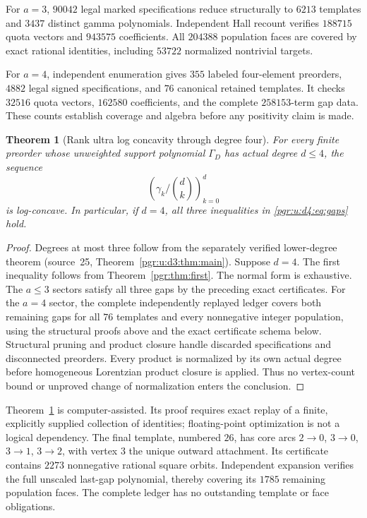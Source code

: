 \documentclass[11pt]{article}
\numberwithin{equation}{section}
\newtheorem{theorem}{Theorem}[section]\newtheorem{lemma}[theorem]{Lemma}\newtheorem{proposition}[theorem]{Proposition}\newtheorem{corollary}[theorem]{Corollary}
\theoremstyle{definition}\newtheorem{definition}[theorem]{Definition}\newtheorem{remark}[theorem]{Remark}
\newcommand{\Ga}{\Gamma}                   %
\begin{document}
For $a=3$, $90042$ legal marked specifications reduce structurally to $6213$ templates and $3437$ distinct gamma polynomials. Independent Hall recount verifies $188715$ quota vectors and $943575$ coefficients. All $204388$ population faces are covered by exact rational identities, including $53722$ normalized nontrivial targets.

For $a=4$, independent enumeration gives $355$ labeled four-element preorders, $4882$ legal signed specifications, and $76$ canonical retained templates. It checks $32516$ quota vectors, $162580$ coefficients, and the complete $258153$-term gap data. These counts establish coverage and algebra before any positivity claim is made.

\begin{theorem}[Rank ultra log concavity through degree four]\label{pgr:u:d4:thm:middle}
For every finite preorder whose unweighted support polynomial $\Ga_D$ has actual degree $d\le4$, the sequence
\[
 \left(\gamma_k/\binom dk\right)_{k=0}^d
\]
is log-concave. In particular, if $d=4$, all three inequalities in \eqref{pgr:u:d4:eq:gaps} hold.
\end{theorem}
\begin{proof}
Degrees at most three follow from the separately verified lower-degree theorem (source~25, Theorem~\ref{pgr:u:d3:thm:main}). Suppose $d=4$. The first inequality follows from Theorem~\ref{pgr:thm:first}. The normal form is exhaustive. The $a\le3$ sectors satisfy all three gaps by the preceding exact certificates. For the $a=4$ sector, the complete independently replayed ledger covers both remaining gaps for all $76$ templates and every nonnegative integer population, using the structural proofs above and the exact certificate schema below. Structural pruning and product closure handle discarded specifications and disconnected preorders. Every product is normalized by its own actual degree before homogeneous Lorentzian product closure is applied. Thus no vertex-count bound or unproved change of normalization enters the conclusion.
\end{proof}
Theorem~\ref{pgr:u:d4:thm:middle} is computer-assisted. Its proof requires exact replay of a finite, explicitly supplied collection of identities; floating-point optimization is not a logical dependency. The final template, numbered $26$, has core arcs $2\to0$, $3\to0$, $3\to1$, $3\to2$, with vertex $3$ the unique outward attachment. Its certificate contains $2273$ nonnegative rational square orbits. Independent expansion verifies the full unscaled last-gap polynomial, thereby covering its $1785$ remaining population faces. The complete ledger has no outstanding template or face obligations.
\end{document}
